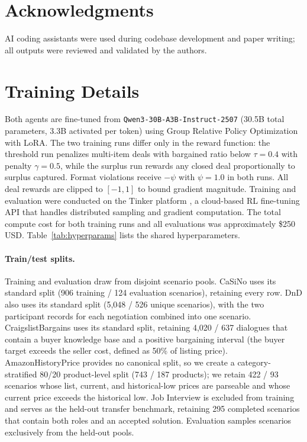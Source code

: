 \documentclass[11pt]{article}
\newcommand{\model}[1]{\texttt{#1}}
\begin{document}
\section*{Acknowledgments}
AI coding assistants were used during codebase development and paper writing; all outputs were reviewed and validated by the authors.


\clearpage

\appendix

\section{Training Details}
\label{app:training}

Both agents are fine-tuned from \model{Qwen3-30B-A3B-Instruct-2507} (30.5B total parameters, 3.3B activated per token) using Group Relative Policy Optimization \citep{shao2024deepseekmath} with LoRA. The two training runs differ only in the reward function: the threshold run penalizes multi-item deals with bargained ratio below $\tau = 0.4$ with penalty $\gamma{=}0.5$, while the surplus run rewards any closed deal proportionally to surplus captured. Format violations receive $-\psi$ with $\psi{=}1.0$ in both runs. All deal rewards are clipped to $[-1, 1]$ to bound gradient magnitude. Training and evaluation were conducted on the Tinker platform \citep{tinker2025}, a cloud-based RL fine-tuning API that handles distributed sampling and gradient computation. The total compute cost for both training runs and all evaluations was approximately \$250 USD. Table~\ref{tab:hyperparams} lists the shared hyperparameters.

\paragraph{Train/test splits.}
Training and evaluation draw from disjoint scenario pools. CaSiNo uses its standard split (906 training / 124 evaluation scenarios), retaining every row. DnD also uses its standard split (5{,}048 / 526 unique scenarios), with the two participant records for each negotiation combined into one scenario. CraigslistBargains uses its standard split, retaining 4{,}020 / 637 dialogues that contain a buyer knowledge base and a positive bargaining interval (the buyer target exceeds the seller cost, defined as 50\% of listing price). AmazonHistoryPrice provides no canonical split, so we create a category-stratified 80/20 product-level split (743 / 187 products); we retain 422 / 93 scenarios whose list, current, and historical-low prices are parseable and whose current price exceeds the historical low. Job Interview is excluded from training and serves as the held-out transfer benchmark, retaining 295 completed scenarios that contain both roles and an accepted solution. Evaluation samples scenarios exclusively from the held-out pools.
\end{document}
